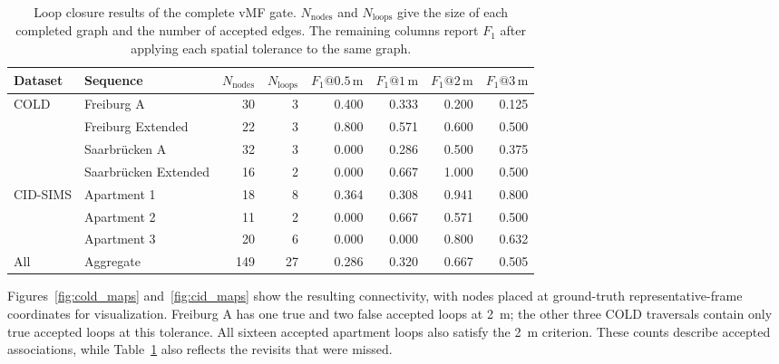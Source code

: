 \documentclass[5p,twocolumn,nonatbib,reversenotenum]{elsarticle}
\begin{document}
\begin{table}[t]
\centering
\caption{Loop closure results of the complete vMF gate. $N_{\mathrm{nodes}}$ and $N_{\mathrm{loops}}$ give the size of each completed graph and the number of accepted edges. The remaining columns report $F_1$ after applying each spatial tolerance to the same graph.}
\label{tab:loops}
\small
\begin{tabular}{llrrrrrr}
\hline
Dataset & Sequence & $N_{\mathrm{nodes}}$ & $N_{\mathrm{loops}}$ & $F_1@0.5\,\mathrm{m}$ & $F_1@1\,\mathrm{m}$ & $F_1@2\,\mathrm{m}$ & $F_1@3\,\mathrm{m}$\\
\hline
\multirow{4}{*}{COLD} & Freiburg A       & 30 & 3 & 0.400 & 0.333 & 0.200 & 0.125\\
 & Freiburg Extended& 22 & 3 & 0.800 & 0.571 & 0.600 & 0.500\\
 & Saarbr\"ucken A  & 32 & 3 & 0.000 & 0.286 & 0.500 & 0.375\\
 & Saarbr\"ucken Extended & 16 & 2 & 0.000 & 0.667 & 1.000 & 0.500\\
\hline
\multirow{3}{*}{CID-SIMS} & Apartment 1      & 18 & 8 & 0.364 & 0.308 & 0.941 & 0.800\\
 & Apartment 2      & 11 & 2 & 0.000 & 0.667 & 0.571 & 0.500\\
 & Apartment 3      & 20 & 6 & 0.000 & 0.000 & 0.800 & 0.632\\
\hline
All & Aggregate        & 149 & 27 & 0.286 & 0.320 & 0.667 & 0.505\\
\hline
\end{tabular}
\end{table}

Figures~\ref{fig:cold_maps} and~\ref{fig:cid_maps} show the resulting connectivity, with nodes placed at ground-truth representative-frame coordinates for visualization. Freiburg A has one true and two false accepted loops at \qty{2}{\metre}; the other three COLD traversals contain only true accepted loops at this tolerance. All sixteen accepted apartment loops also satisfy the \qty{2}{\metre} criterion. These counts describe accepted associations, while Table~\ref{tab:loops} also reflects the revisits that were missed.
\end{document}
